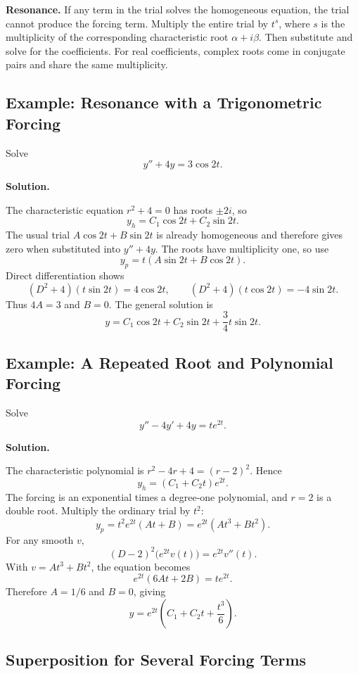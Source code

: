 \documentclass[11pt]{article}
\newenvironment{solution}
    {\par\noindent\textbf{Solution.}\par}
    {\par}
\begin{document}
\textbf{Resonance.} If any term in the trial solves the homogeneous
equation, the trial cannot produce the forcing term. Multiply the
entire trial by \(t^s\), where \(s\) is the multiplicity of the
corresponding characteristic root \(\alpha+i\beta\). Then substitute
and solve for the coefficients. For real coefficients, complex roots
come in conjugate pairs and share the same multiplicity.

\subsection{Example: Resonance with a Trigonometric Forcing}

Solve
\[
y''+4y=3\cos 2t.
\]

\begin{solution}
The characteristic equation \(r^2+4=0\) has roots \(\pm2i\), so
\[
y_h=C_1\cos2t+C_2\sin2t.
\]
The usual trial \(A\cos2t+B\sin2t\) is already homogeneous and
therefore gives zero when substituted into \(y''+4y\). The roots have
multiplicity one, so use
\[
y_p=t(A\sin2t+B\cos2t).
\]
Direct differentiation shows
\[
(D^2+4)(t\sin2t)=4\cos2t,
\qquad
(D^2+4)(t\cos2t)=-4\sin2t.
\]
Thus \(4A=3\) and \(B=0\). The general solution is
\[
\boxed{y=C_1\cos2t+C_2\sin2t+\frac34t\sin2t.}
\]
\end{solution}

\subsection{Example: A Repeated Root and Polynomial Forcing}

Solve
\[
y''-4y'+4y=t e^{2t}.
\]

\begin{solution}
The characteristic polynomial is
\(r^2-4r+4=(r-2)^2\). Hence
\[
y_h=(C_1+C_2t)e^{2t}.
\]
The forcing is an exponential times a degree-one polynomial, and
\(r=2\) is a double root. Multiply the ordinary trial by \(t^2\):
\[
y_p=t^2e^{2t}(At+B)=e^{2t}(At^3+Bt^2).
\]
For any smooth \(v\),
\[
(D-2)^2\bigl(e^{2t}v(t)\bigr)=e^{2t}v''(t).
\]
With \(v=At^3+Bt^2\), the equation becomes
\[
e^{2t}(6At+2B)=te^{2t}.
\]
Therefore \(A=1/6\) and \(B=0\), giving
\[
\boxed{y=e^{2t}\left(C_1+C_2t+\frac{t^3}{6}\right).}
\]
\end{solution}

\subsection{Superposition for Several Forcing Terms}
\end{document}

